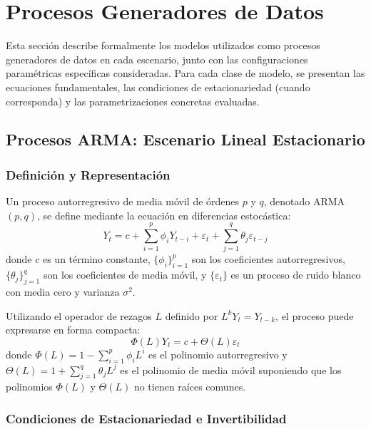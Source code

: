 \section{Procesos Generadores de Datos}
\label{sec:procesos_generadores}

Esta sección describe formalmente los modelos utilizados como procesos generadores de datos en cada escenario, junto con las configuraciones paramétricas específicas consideradas. Para cada clase de modelo, se presentan las ecuaciones fundamentales, las condiciones de estacionariedad (cuando corresponda) y las parametrizaciones concretas evaluadas.
\subsection{Procesos ARMA: Escenario Lineal Estacionario}
\label{subsec:arma}

\subsubsection{Definición y Representación}

Un proceso autorregresivo de media móvil de órdenes $p$ y $q$, denotado ARMA$(p,q)$, se define mediante la ecuación en diferencias estocástica:
\begin{equation}
Y_t = c + \sum_{i=1}^p \phi_i Y_{t-i} + \varepsilon_t + \sum_{j=1}^q \theta_j \varepsilon_{t-j}
\label{eq:arma_general}
\end{equation}
donde $c$ es un término constante, $\{\phi_i\}_{i=1}^p$ son los coeficientes autorregresivos, $\{\theta_j\}_{j=1}^q$ son los coeficientes de media móvil, y $\{\varepsilon_t\}$ es un proceso de ruido blanco con media cero y varianza $\sigma^2$.

Utilizando el operador de rezagos $L$ definido por $L^k Y_t = Y_{t-k}$, el proceso puede expresarse en forma compacta:
\begin{equation}
\Phi(L) Y_t = c + \Theta(L) \varepsilon_t
\label{eq:arma_lag_operator}
\end{equation}
donde $\Phi(L) = 1 - \sum_{i=1}^p \phi_i L^i$ es el polinomio autorregresivo y $\Theta(L) = 1 + \sum_{j=1}^q \theta_j L^j$ es el polinomio de media móvil suponiendo que los polinomios $\Phi(L)$ y $\Theta(L)$ no tienen raíces comunes.

\subsubsection{Condiciones de Estacionariedad e Invertibilidad}

